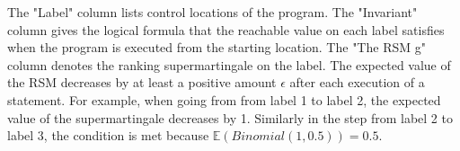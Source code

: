 \documentclass[sigconf,review, anonymous]{acmart}
\begin{document}
The "Label" column lists control locations of the program. The "Invariant" column gives the logical formula that the reachable value on each label satisfies when the program is executed from the starting location. The "The RSM g" column denotes the ranking supermartingale on the label. The expected value of the RSM decreases by at least a positive amount $\epsilon$ after each execution of a statement. For example, 
when going from  from label 1 to label 2, the expected value of the supermartingale decreases by 1. Similarly  in the step from label 2 to label 3,  the condition is met because $\mathbb{E}(Binomial(1,0.5))=0.5$.
\end{document}

